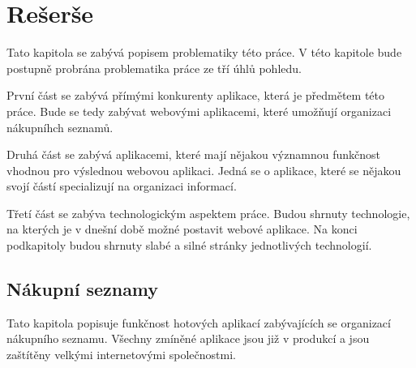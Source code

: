 
\chapter{Rešerše}
Tato kapitola se zabývá popisem problematiky této práce. V této kapitole bude postupně probrána problematika práce ze tří úhlů pohledu.

První část se zabývá přímými konkurenty aplikace, která je předmětem této práce. Bude se tedy zabývat webovými aplikacemi, které umožňují organizaci nákupníhch seznamů.

Druhá část se zabývá aplikacemi, které mají nějakou významnou funkčnost vhodnou pro výslednou webovou aplikaci. Jedná se o aplikace, které se nějakou svojí částí specializují na organizaci informací.

Třetí část se zabýva technologickým aspektem práce. Budou shrnuty technologie, na kterých je v dnešní době možné postavit webové aplikace. Na konci podkapitoly budou shrnuty slabé a silné stránky jednotlivých technologií.

\section{Nákupní seznamy}
Tato kapitola popisuje funkčnost hotových aplikací zabývajících se organizací nákupního seznamu. Všechny zmíněné aplikace jsou již v produkcí a jsou zaštítěny velkými internetovými společnostmi.

